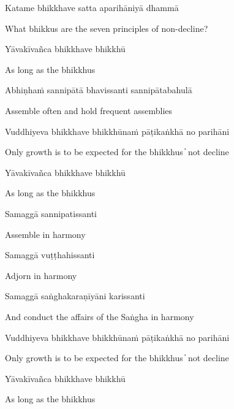 Katame bhikkhave satta aparihāniyā dhammā

\begin{cprenglish}
What bhikkus are the seven principles of non-decline?
\end{cprenglish}

Yāvakīvañca bhikkhave bhikkhū

\begin{cprenglish}
As long as the bhikkhus
\end{cprenglish}

Abhiṇhaṁ sannipātā bhavissanti sannipātabahulā

\begin{cprenglish}
Assemble often and hold frequent assemblies
\end{cprenglish}

Vuddhiyeva bhikkhave bhikkhūnaṁ pāṭikaṅkhā no parihāni

\begin{cprenglish}
Only growth is to be expected for the bhikkhus  ̓  not decline
\end{cprenglish}

Yāvakīvañca bhikkhave bhikkhū

\begin{cprenglish}
As long as the bhikkhus
\end{cprenglish}

Samaggā sannipatissanti

\begin{cprenglish}
Assemble in harmony
\end{cprenglish}

Samaggā vuṭṭhahissanti

\begin{cprenglish}
Adjorn in harmony
\end{cprenglish}

Samaggā saṅghakaraṇīyāni karissanti

\begin{cprenglish}
And conduct the affairs of the Saṅgha in harmony
\end{cprenglish}

Vuddhiyeva bhikkhave bhikkhūnaṁ pāṭikaṅkhā no parihāni

\begin{cprenglish}
Only growth is to be expected for the bhikkhus  ̓  not decline
\end{cprenglish}

Yāvakīvañca bhikkhave bhikkhū

\begin{cprenglish}
As long as the bhikkhus
\end{cprenglish}

